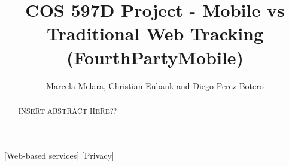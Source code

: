\documentclass{acm_proc_article-sp}
\begin{document}
\title{COS 597D Project - Mobile vs Traditional Web Tracking\\(FourthPartyMobile)}
%
%
%
%
%

%
\author{
%
%
\alignauthor
Marcela Melara, Christian Eubank and Diego Perez Botero \\ 
}

\maketitle

\begin{abstract}
INSERT ABSTRACT HERE??
\end{abstract}

[Web-based services]
[Privacy]
\end{document}
